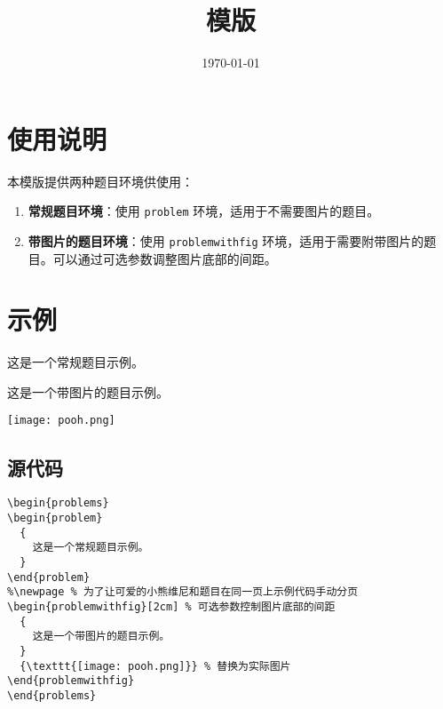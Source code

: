 \documentclass[a4paper , final]{ctexart}
\title{模版}
\date{\today}
\newenvironment{problem}[1]{%
  \item #1
  \par
  \vspace{8cm}
}{}
\newenvironment{problemwithfig}[3][2cm]{%
  \item #2
  \par\noindent
  \begin{minipage}[t][8cm][b]{\linewidth}
    \vfill
    \hfill #3
    \par\vspace{#1} %
  \end{minipage}
}{}
\begin{document}
\maketitle

\section*{使用说明}

本模版提供两种题目环境供使用：

\begin{enumerate}
  \item \textbf{常规题目环境}：使用 \texttt{problem} 环境，适用于不需要图片的题目。
  \item \textbf{带图片的题目环境}：使用 \texttt{problemwithfig} 环境，适用于需要附带图片的题目。可以通过可选参数调整图片底部的间距。
\end{enumerate}

\section*{示例}

\begin{problems}
  \begin{problem}
    {
      这是一个常规题目示例。
    }
  \end{problem}
  \newpage
  \begin{problemwithfig}[2cm] %
    {
      这是一个带图片的题目示例。
    }
    {\texttt{[image: pooh.png]}} %
  \end{problemwithfig}
\end{problems}

\subsection*{源代码}

\begin{verbatim}
\begin{problems}
\begin{problem}
  {
    这是一个常规题目示例。
  }
\end{problem}
%\newpage % 为了让可爱的小熊维尼和题目在同一页上示例代码手动分页
\begin{problemwithfig}[2cm] % 可选参数控制图片底部的间距
  {
    这是一个带图片的题目示例。
  }
  {\texttt{[image: pooh.png]}} % 替换为实际图片
\end{problemwithfig}
\end{problems}
\end{verbatim}
\end{document}
